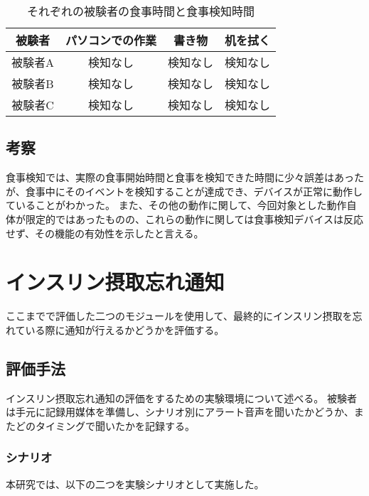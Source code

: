 \begin{table}[htbp]
  \caption{それぞれの被験者の食事時間と食事検知時間}
  \label{tb:others_detection_result}
  \begin{center}
    \begin{tabular}{|c||c|c|c|}
      \hline
      被験者  & パソコンでの作業 & 書き物 & 机を拭く \\
      \hline\hline
      被験者A & 検知なし & 検知なし & 検知なし \\\hline
      被験者B & 検知なし & 検知なし & 検知なし \\\hline
      被験者C & 検知なし & 検知なし & 検知なし \\\hline
    \end{tabular}
  \end{center}
\end{table}

\subsection{考察}

食事検知では、実際の食事開始時間と食事を検知できた時間に少々誤差はあったが、食事中にそのイベントを検知することが達成でき、デバイスが正常に動作していることがわかった。
また、その他の動作に関して、今回対象とした動作自体が限定的ではあったものの、これらの動作に関しては食事検知デバイスは反応せず、その機能の有効性を示したと言える。

\section{インスリン摂取忘れ通知}
ここまでで評価した二つのモジュールを使用して、最終的にインスリン摂取を忘れている際に通知が行えるかどうかを評価する。

\subsection{評価手法}
インスリン摂取忘れ通知の評価をするための実験環境について述べる。
被験者は手元に記録用媒体を準備し、シナリオ別にアラート音声を聞いたかどうか、またどのタイミングで聞いたかを記録する。

\subsubsection{シナリオ}

本研究では、以下の二つを実験シナリオとして実施した。

